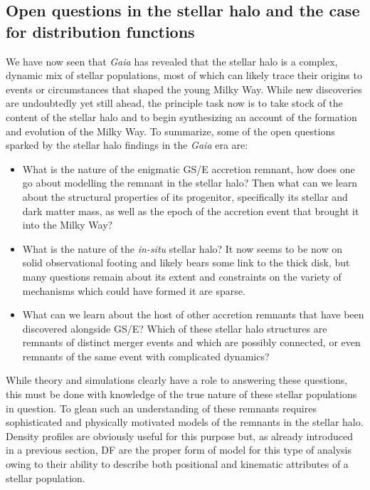 \subsection{Open questions in the stellar halo and the case for distribution functions}

We have now seen that \textit{Gaia} has revealed that the stellar halo is a complex, dynamic mix of stellar populations, most of which can likely trace their origins to events or circumstances that shaped the young Milky Way. While new discoveries are undoubtedly yet still ahead, the principle task now is to take stock of the content of the stellar halo and to begin synthesizing an account of the formation and evolution of the Milky Way. To summarize, some of the open questions sparked by the stellar halo findings in the \textit{Gaia} era are:

\begin{itemize}
    \item What is the nature of the enigmatic GS/E accretion remnant, how does one go about modelling the remnant in the stellar halo? Then what can we learn about the structural properties of its progenitor, specifically its stellar and dark matter mass, as well as the epoch of the accretion event that brought it into the Milky Way?
    
    \item What is the nature of the \textit{in-situ} stellar halo? It now seems to be now on solid observational footing and likely bears some link to the thick disk, but many questions remain about its extent and constraints on the variety of mechanisms which could have formed it are sparse.
    
    \item What can we learn about the host of other accretion remnants that have been discovered alongside GS/E? Which of these stellar halo structures are remnants of distinct merger events and which are possibly connected, or even remnants of the same event with complicated dynamics?
\end{itemize}

While theory and simulations clearly have a role to answering these questions, this must be done with knowledge of the true nature of these stellar populations in question. To glean such an understanding of these remnants requires sophisticated and physically motivated models of the remnants in the stellar halo. Density profiles are obviously useful for this purpose but, as already introduced in a previous section, DF are the proper form of model for this type of analysis owing to their ability to describe both positional and kinematic attributes of a stellar population.

